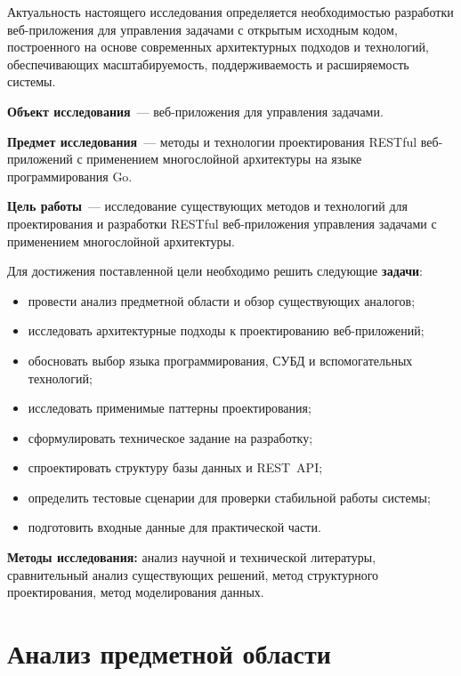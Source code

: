 \documentclass[a4paper,14pt]{extarticle}
\begin{document}
Актуальность настоящего исследования определяется необходимостью разработки веб-приложения для управления задачами с открытым исходным кодом, построенного на основе современных архитектурных подходов и технологий, обеспечивающих масштабируемость, поддерживаемость и расширяемость системы.

\textbf{Объект исследования}~--- веб-приложения для управления задачами.

\textbf{Предмет исследования}~--- методы и технологии проектирования RESTful веб-приложений с применением многослойной архитектуры на языке программирования Go.

\textbf{Цель работы}~--- исследование существующих методов и технологий для проектирования и разработки RESTful веб-приложения управления задачами с применением многослойной архитектуры.

Для достижения поставленной цели необходимо решить следующие \textbf{задачи}:

\begin{itemize}[leftmargin=1.25cm, itemsep=0pt]
  \item[---] провести анализ предметной области и обзор существующих аналогов;
  \item[---] исследовать архитектурные подходы к проектированию веб-приложений;
  \item[---] обосновать выбор языка программирования, СУБД и вспомогательных технологий;
  \item[---] исследовать применимые паттерны проектирования;
  \item[---] сформулировать техническое задание на разработку;
  \item[---] спроектировать структуру базы данных и REST~API;
  \item[---] определить тестовые сценарии для проверки стабильной работы системы;
  \item[---] подготовить входные данные для практической части.
\end{itemize}

\textbf{Методы исследования:} анализ научной и технической литературы, сравнительный анализ существующих решений, метод структурного проектирования, метод моделирования данных.

\clearpage
\section{Анализ предметной области}
\end{document}
